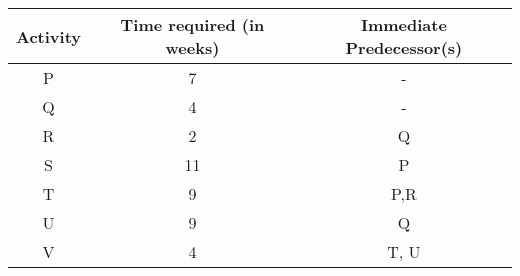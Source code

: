 \begin{center}
\begin{tabular}{|c|c|c|}
    \hline
    {Activity} & {Time required (in weeks)} & {Immediate Predecessor(s)} \\
    \hline
    P & 7 & - \\
    Q & 4 & - \\
    R & 2 & Q \\
    S & 11 & P \\
    T & 9 & P,R \\
    U & 9 & Q\\
    V & 4 & T, U \\
    \hline
\end{tabular}
\end{center}
